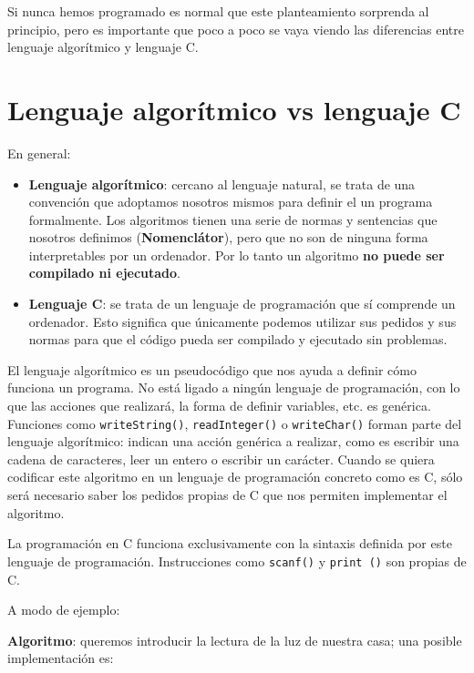\documentclass[
]{book}
\providecommand{\tightlist}{%
  \setlength{\itemsep}{0pt}\setlength{\parskip}{0pt}}
\begin{document}
Si nunca hemos programado es normal que este planteamiento sorprenda al principio, pero es importante que poco a poco se vaya viendo las diferencias entre lenguaje algorítmico y lenguaje C.

\hypertarget{lenguaje-algoruxedtmico-vs-lenguaje-c}{%
\section{Lenguaje algorítmico vs lenguaje C}\label{lenguaje-algoruxedtmico-vs-lenguaje-c}}

En general:

\begin{itemize}
\tightlist
\item
  \textbf{Lenguaje algorítmico}: cercano al lenguaje natural, se trata de una convención que adoptamos nosotros mismos para definir el un programa formalmente. Los algoritmos tienen una serie de normas y sentencias que nosotros definimos (\textbf{Nomenclátor}), pero que no son de ninguna forma interpretables por un ordenador. Por lo tanto un algoritmo \textbf{no puede ser compilado ni ejecutado}.
\item
  \textbf{Lenguaje C}: se trata de un lenguaje de programación que sí comprende un ordenador. Esto significa que únicamente podemos utilizar sus pedidos y sus normas para que el código pueda ser compilado y ejecutado sin problemas.
\end{itemize}

El lenguaje algorítmico es un pseudocódigo que nos ayuda a definir cómo funciona un programa. No está ligado a ningún lenguaje de programación, con lo que las acciones que realizará, la forma de definir variables, etc. es genérica. Funciones como \texttt{writeString()}, \texttt{readInteger()} o \texttt{writeChar()} forman parte del lenguaje algorítmico: indican una acción genérica a realizar, como es escribir una cadena de caracteres, leer un entero o escribir un carácter. Cuando se quiera codificar este algoritmo en un lenguaje de programación concreto como es C, sólo será necesario saber los pedidos propias de C que nos permiten implementar el algoritmo.

La programación en C funciona exclusivamente con la sintaxis definida por este lenguaje de programación. Instrucciones como \texttt{scanf()} y \texttt{print\ ()} son propias de C.

A modo de ejemplo:

\textbf{Algoritmo}: queremos introducir la lectura de la luz de nuestra casa; una posible implementación es:
\end{document}

